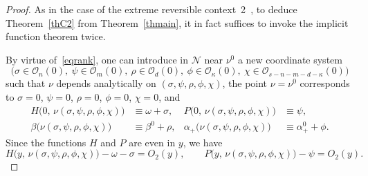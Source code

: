 \documentclass[12pt,reqno]{amsart}
\theoremstyle{definition}
\begin{document}
\begin{proof}
As in the case of the extreme reversible context~2~\cite{S11}, to deduce
Theorem~\ref{thC2} from Theorem~\ref{thmain}, it in fact suffices to invoke
the implicit function theorem twice.

By virtue of~\eqref{eqrank}, one can introduce in ${\mathcal N}$ near $\nu^0$ a new
coordinate system
\[
\bigl( \sigma\in{\mathcal O}_n(0), \: \psi\in{\mathcal O}_m(0), \: \rho\in{\mathcal O}_d(0), \:
\phi\in{\mathcal O}_\kappa(0), \: \chi\in{\mathcal O}_{s-n-m-d-\kappa}(0) \bigr)
\]
such that $\nu$ depends analytically on $(\sigma,\psi,\rho,\phi,\chi)$, the
point $\nu=\nu^0$ corresponds to $\sigma=0$, $\psi=0$, $\rho=0$, $\phi=0$,
$\chi=0$, and
\begin{align*}
H\bigl(0, \, \nu(\sigma,\psi,\rho,\phi,\chi)\bigr) &\equiv \omega+\sigma, &
P\bigl(0, \, \nu(\sigma,\psi,\rho,\phi,\chi)\bigr) &\equiv \psi, \\
\beta\bigl(\nu(\sigma,\psi,\rho,\phi,\chi)\bigr) &\equiv \beta^0+\rho, &
\alpha_+\bigl(\nu(\sigma,\psi,\rho,\phi,\chi)\bigr) &\equiv \alpha^0_++\phi.
\end{align*}
Since the functions $H$ and $P$ are even in $y$, we have
\begin{equation}
H\bigl(y, \, \nu(\sigma,\psi,\rho,\phi,\chi)\bigr)-\omega-\sigma=O_2(y),
\qquad P\bigl(y, \, \nu(\sigma,\psi,\rho,\phi,\chi)\bigr)-\psi=O_2(y).
\label{eqeven}
\end{equation}


\end{proof}
\end{document}
